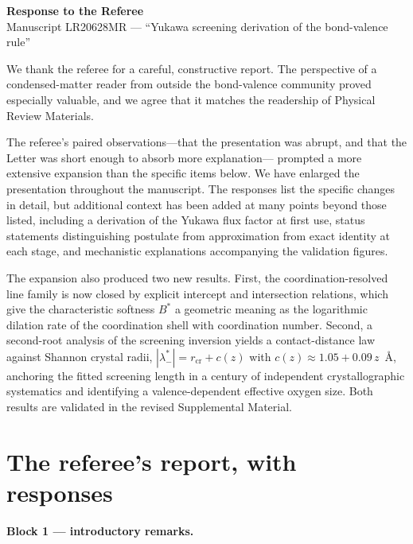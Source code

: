 \documentclass[11pt]{article}
\begin{document}
\begin{center}
{\large\bfseries Response to the Referee}\\[2pt]
Manuscript LR20628MR --- ``Yukawa screening derivation of the bond-valence rule''
\end{center}

We thank the referee for a careful, constructive report.  The
perspective of a condensed-matter reader from outside the bond-valence
community proved especially valuable, and we agree that it matches the
readership of Physical Review Materials.

The referee's paired observations---that the presentation was abrupt,
and that the Letter was short enough to absorb more explanation---%
prompted a more extensive expansion than the specific items below.  We
have enlarged the presentation throughout the manuscript.  The
responses list the specific changes in detail, but additional context
has been added at many points beyond those listed, including a
derivation of the Yukawa flux factor at first use, status statements
distinguishing postulate from approximation from exact identity at
each stage, and mechanistic explanations accompanying the validation
figures.  

The expansion also produced two new results.  First, the
coordination-resolved line family is now closed by explicit intercept
and intersection relations, which give the characteristic softness
$B^*$ a geometric meaning as the logarithmic dilation rate of the
coordination shell with coordination number.  Second, a second-root
analysis of the screening inversion yields a contact-distance law
against Shannon crystal radii, $|\lambda^*_-|=r_{\mathrm{cr}}+c(z)$
with $c(z)\approx 1.05+0.09\,z$~\AA, anchoring the fitted screening
length in a century of independent crystallographic systematics and
identifying a valence-dependent effective oxygen size.  Both results
are validated in the revised Supplemental Material.

\section*{The referee's report, with responses}

\textbf{Block 1 --- introductory remarks.}
\end{document}

